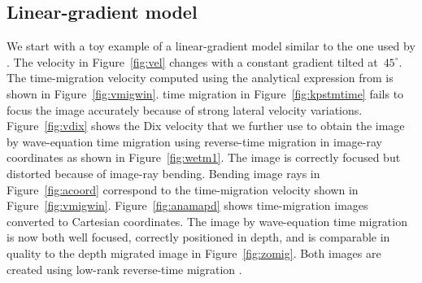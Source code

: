 \subsection{Linear-gradient model}
We start with a toy example of a linear-gradient model similar to the one used by \cite{TLE21-12-12371241}. The velocity in Figure~\ref{fig:vel} changes with a constant gradient tilted at~$45^{\circ}$. 
The time-migration velocity computed using the analytical expression from \cite{siwei2} is shown in Figure~\ref{fig:vmigwin}.  time migration in Figure~\ref{fig:kpstmtime} fails to focus the image accurately because of strong lateral velocity variations.  Figure~\ref{fig:vdix} shows the Dix velocity that we further use to obtain the image by wave-equation time migration using reverse-time migration in image-ray coordinates  as shown in Figure~\ref{fig:wetm1}. The image is correctly focused but distorted because of image-ray bending. Bending image rays in Figure~\ref{fig:acoord} correspond to the time-migration velocity shown in Figure~\ref{fig:vmigwin}. 
Figure~\ref{fig:anamapd} shows time-migration images converted to Cartesian coordinates. The image by wave-equation time migration is now both well focused, correctly positioned in depth, and is comparable in quality to the depth migrated image in Figure~\ref{fig:zomig}. Both images are created using low-rank reverse-time migration \cite[]{lowrank}.

